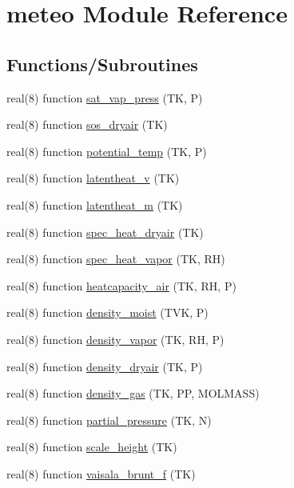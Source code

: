 \hypertarget{namespacemeteo}{}\section{meteo Module Reference}
\label{namespacemeteo}
\subsection*{Functions/\+Subroutines}
\begin{DoxyCompactItemize}
\item 
real(8) function \hyperlink{namespacemeteo_a6777852efdfd10f05bb7467fd99f03ec}{sat\+\_\+vap\+\_\+press} (TK, P)
\item 
real(8) function \hyperlink{namespacemeteo_a799c55d98d43606ee55dfcb2ed973c02}{sos\+\_\+dryair} (TK)
\item 
real(8) function \hyperlink{namespacemeteo_a537068a2255cff524747621cd522b93a}{potential\+\_\+temp} (TK, P)
\item 
real(8) function \hyperlink{namespacemeteo_afaaf9cd39b3f9994813ea6197d3a74bf}{latentheat\+\_\+v} (TK)
\item 
real(8) function \hyperlink{namespacemeteo_a57634c251a493116d57d49865d95c7a6}{latentheat\+\_\+m} (TK)
\item 
real(8) function \hyperlink{namespacemeteo_a1db0e89d35e5eae20acb839111603927}{spec\+\_\+heat\+\_\+dryair} (TK)
\item 
real(8) function \hyperlink{namespacemeteo_a2458549db90b31c67886950a36fe2370}{spec\+\_\+heat\+\_\+vapor} (TK, RH)
\item 
real(8) function \hyperlink{namespacemeteo_a1c0a3877fc85ffd63bbf91b3e710b602}{heatcapacity\+\_\+air} (TK, RH, P)
\item 
real(8) function \hyperlink{namespacemeteo_afeb4cd9d5827418a587e1b78093b08f5}{density\+\_\+moist} (T\+VK, P)
\item 
real(8) function \hyperlink{namespacemeteo_a4a51e0e5cdc190c3e5eccdb69c267382}{density\+\_\+vapor} (TK, RH, P)
\item 
real(8) function \hyperlink{namespacemeteo_a2d3b6838da7330c4e146845991c0bc8a}{density\+\_\+dryair} (TK, P)
\item 
real(8) function \hyperlink{namespacemeteo_a5c26a948b622d4d5ffd1f16f755e3c96}{density\+\_\+gas} (TK, PP, M\+O\+L\+M\+A\+SS)
\item 
real(8) function \hyperlink{namespacemeteo_a0171c7d6a68810bdaa89cb39c92ee96f}{partial\+\_\+pressure} (TK, N)
\item 
real(8) function \hyperlink{namespacemeteo_ad07039dc16c44b421a37a93ec073d7ac}{scale\+\_\+height} (TK)
\item 
real(8) function \hyperlink{namespacemeteo_a60b3a3a3f1d7b40ed8b9fd4b55a9e06b}{vaisala\+\_\+brunt\+\_\+f} (TK)
\end{DoxyCompactItemize}
